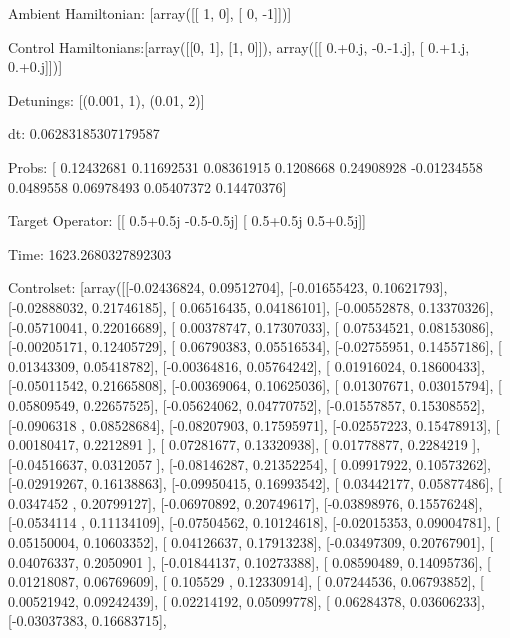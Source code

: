 \documentclass{article}
\begin{document}
    

\newpage

Ambient Hamiltonian: [array([[ 1,  0],
       [ 0, -1]])]

Control Hamiltonians:[array([[0, 1],
       [1, 0]]), array([[ 0.+0.j, -0.-1.j],
       [ 0.+1.j,  0.+0.j]])]

Detunings: [(0.001, 1), (0.01, 2)]

 dt: 0.06283185307179587

Probs: [ 0.12432681  0.11692531  0.08361915  0.1208668   0.24908928 -0.01234558
  0.0489558   0.06978493  0.05407372  0.14470376]

Target Operator: [[ 0.5+0.5j -0.5-0.5j]
 [ 0.5+0.5j  0.5+0.5j]]

Time: 1623.2680327892303

Controlset: [array([[-0.02436824,  0.09512704],
       [-0.01655423,  0.10621793],
       [-0.02888032,  0.21746185],
       [ 0.06516435,  0.04186101],
       [-0.00552878,  0.13370326],
       [-0.05710041,  0.22016689],
       [ 0.00378747,  0.17307033],
       [ 0.07534521,  0.08153086],
       [-0.00205171,  0.12405729],
       [ 0.06790383,  0.05516534],
       [-0.02755951,  0.14557186],
       [ 0.01343309,  0.05418782],
       [-0.00364816,  0.05764242],
       [ 0.01916024,  0.18600433],
       [-0.05011542,  0.21665808],
       [-0.00369064,  0.10625036],
       [ 0.01307671,  0.03015794],
       [ 0.05809549,  0.22657525],
       [-0.05624062,  0.04770752],
       [-0.01557857,  0.15308552],
       [-0.0906318 ,  0.08528684],
       [-0.08207903,  0.17595971],
       [-0.02557223,  0.15478913],
       [ 0.00180417,  0.2212891 ],
       [ 0.07281677,  0.13320938],
       [ 0.01778877,  0.2284219 ],
       [-0.04516637,  0.0312057 ],
       [-0.08146287,  0.21352254],
       [ 0.09917922,  0.10573262],
       [-0.02919267,  0.16138863],
       [-0.09950415,  0.16993542],
       [ 0.03442177,  0.05877486],
       [ 0.0347452 ,  0.20799127],
       [-0.06970892,  0.20749617],
       [-0.03898976,  0.15576248],
       [-0.0534114 ,  0.11134109],
       [-0.07504562,  0.10124618],
       [-0.02015353,  0.09004781],
       [ 0.05150004,  0.10603352],
       [ 0.04126637,  0.17913238],
       [-0.03497309,  0.20767901],
       [ 0.04076337,  0.2050901 ],
       [-0.01844137,  0.10273388],
       [ 0.08590489,  0.14095736],
       [ 0.01218087,  0.06769609],
       [ 0.105529  ,  0.12330914],
       [ 0.07244536,  0.06793852],
       [ 0.00521942,  0.09242439],
       [ 0.02214192,  0.05099778],
       [ 0.06284378,  0.03606233],
       [-0.03037383,  0.16683715],
\end{document}
